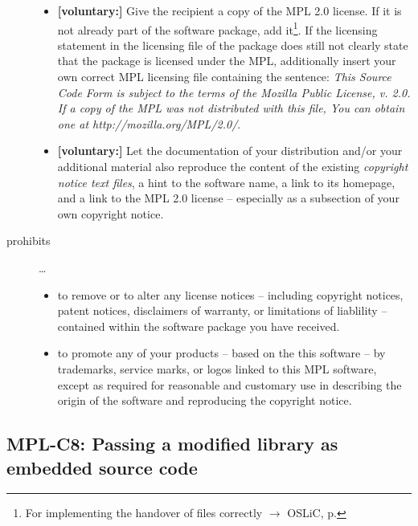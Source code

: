 \begin{description}
\begin{itemize}
  \item \textbf{[voluntary:]} Give the recipient a copy of the MPL 2.0 license.
  If it is not already part of the software package, add it\footnote{For
  implementing the handover of files correctly $\rightarrow$ OSLiC, p.
  \pageref{DistributingFilesHint}}. If the licensing statement in the licensing
  file of the package does still not clearly state that the package is licensed
  under the MPL, additionally insert your own correct MPL licensing file
  containing the sentence: \emph{This Source Code Form is subject to the terms
  of the Mozilla Public License, v. 2.0. If a copy of the MPL was not
  distributed with this file, You can obtain one at
  http://mozilla.org/MPL/2.0/}.
  
  \item \textbf{[voluntary:]} Let the documentation of your distribution and/or
  your additional material  also reproduce the content of the existing
  \emph{copyright notice text files}, a hint to the software name, a link to its
  homepage, and a link to the MPL 2.0 license -- especially as a subsection of
  your own copyright notice.
  
\end{itemize}

\item[prohibits] \ldots
\begin{itemize}
  \item to remove or to alter any license notices -- including copyright
  notices, patent notices, disclaimers of warranty, or limitations of liablility
  -- contained within the software package you have received.
  \item to promote any of your products -- based on the this software -- by
  trademarks, service marks, or logos linked to this MPL software, except as 
  required for reasonable and customary use in describing the origin
  of the software and reproducing the  copyright notice.
\end{itemize}

\end{description}

\subsection{MPL-C8: Passing a modified library as embedded source code}
\label{OSUC-10S-MPL}

